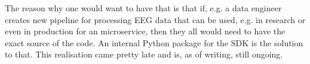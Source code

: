 The reason why one would want to have that is that if, e.g. a data engineer creates new pipeline for processing EEG data that can be used, e.g. in research or even in production for an microservice, then they all would need to have the exact source of the code. An internal Python package for the SDK is the solution to that. This realisation came pretty late and is, as of writing, still ongoing.
